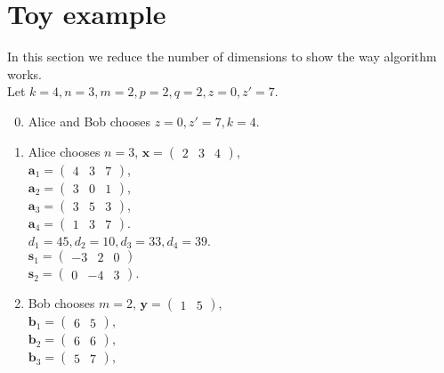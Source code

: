 \section{Toy example}
In this section we reduce the number of dimensions to show the way algorithm works. \\
Let $ k = 4, n = 3, m = 2, p = 2, q = 2, z = 0, z' = 7 $. \\
\begin{enumerate}
	\setcounter{enumi}{-1}
	\item Alice and Bob chooses $ z = 0, z' = 7, k = 4 $.
	\item Alice chooses $ n = 3 $, $ \textbf{x} = \begin{pmatrix} 2 & 3 & 4 \end{pmatrix}	 $,\\
	 $ \textbf{a}_1 = \begin{pmatrix} 4 & 3 & 7 \end{pmatrix} $, \\
	 $ \textbf{a}_2 = \begin{pmatrix} 3 & 0 & 1 \end{pmatrix} $, \\ 
	 $ \textbf{a}_3 = \begin{pmatrix} 3 & 5 & 3 \end{pmatrix} $, \\
	 $ \textbf{a}_4 = \begin{pmatrix} 1 & 3 & 7 \end{pmatrix} $. \\
	 $ d_1 = 45, d_2 = 10, d_3 = 33, d_4 = 39 $. \\
	 $ \textbf{s}_1 = \begin{pmatrix} -3 & 2 & 0 \end{pmatrix}$\\
	 $ \textbf{s}_2 = \begin{pmatrix} 0 & -4 & 3 \end{pmatrix} $. 
	\item Bob chooses $ m = 2 $, $ \textbf{y} = \begin{pmatrix} 1 & 5 \end{pmatrix} $,\\
	$ \textbf{b}_1 = \begin{pmatrix} 6 & 5 \end{pmatrix}$,\\
	$\textbf{b}_2 = \begin{pmatrix} 6 & 6 \end{pmatrix}$,\\ 
	$\textbf{b}_3 = \begin{pmatrix} 5 & 7 \end{pmatrix}$,\\

\end{enumerate}
